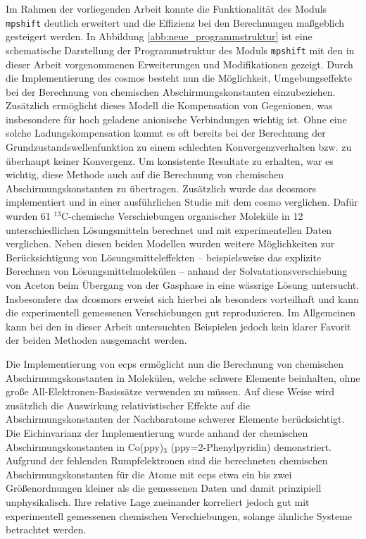 Im Rahmen der vorliegenden Arbeit konnte die Funktionalität des Moduls \texttt{mpshift} deutlich erweitert und die Effizienz bei den Berechnungen maßgeblich gesteigert werden. In Abbildung \ref{abb:neue_programmstruktur} ist eine schematische Darstellung der Programmstruktur des Moduls \texttt{mpshift} mit den in dieser Arbeit vorgenommenen Erweiterungen und Modifikationen gezeigt. Durch die Implementierung des \acfp{cosmo} besteht nun die Möglichkeit, Umgebungseffekte bei der Berechnung von chemischen Abschirmungskonstanten einzubeziehen. Zusätzlich ermöglicht dieses Modell die Kompensation von Gegenionen, was insbesondere für hoch geladene anionische Verbindungen wichtig ist. Ohne eine solche Ladungskompensation kommt es oft bereits bei der Berechnung der Grundzustandswellenfunktion zu einem schlechten Konvergenzverhalten bzw. zu überhaupt keiner Konvergenz. Um konsistente Resultate zu erhalten, war es wichtig, diese Methode auch auf die Berechnung von chemischen Abschirmungskonstanten zu übertragen. Zusätzlich wurde das \acf{dcosmors} implementiert und in einer ausführlichen Studie mit dem \ac{cosmo} verglichen. Dafür wurden 61 $^{13}$C-chemische Verschiebungen organischer Moleküle in 12 unterschiedlichen Lösungsmitteln berechnet und mit experimentellen Daten verglichen. Neben diesen beiden Modellen wurden weitere Möglichkeiten zur Berücksichtigung von Lösungsmitteleffekten -- beispielsweise das explizite Berechnen von Lösungsmittelmolekülen -- anhand der Solvatationsverschiebung von Aceton beim Übergang von der Gasphase in eine wässrige Lösung untersucht. Insbesondere das \ac{dcosmors} erweist sich hierbei als besonders vorteilhaft und kann die experimentell gemessenen Verschiebungen gut reproduzieren. Im Allgemeinen kann bei den in dieser Arbeit untersuchten Beispielen jedoch kein klarer Favorit der beiden Methoden ausgemacht werden.

Die Implementierung von \acfp{ecp} ermöglicht nun die Berechnung von chemischen Abschirmungskonstanten in Molekülen, welche schwere Elemente beinhalten, ohne große All-Elektronen-Basissätze verwenden zu müssen. Auf diese Weise wird zusätzlich die Auswirkung relativistischer Effekte auf die Abschirmungskonstanten der Nachbaratome schwerer Elemente berücksichtigt. Die Eichinvarianz der Implementierung wurde anhand der chemischen Abschirmungskonstanten in Co(ppy)$_3$ (ppy=2-Phenylpyridin) demonstriert. Aufgrund der fehlenden Rumpfelektronen sind die berechneten chemischen Abschirmungskonstanten für die Atome mit \acp{ecp} etwa ein bis zwei Größenordnungen kleiner als die gemessenen Daten und damit prinzipiell unphysikalisch. Ihre relative Lage zueinander korreliert jedoch gut mit experimentell gemessenen chemischen Verschiebungen, solange ähnliche Systeme betrachtet werden.

